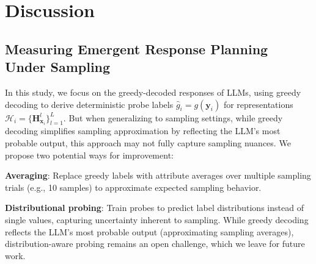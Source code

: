 \section{Discussion}
\subsection{Measuring Emergent Response Planning Under Sampling}
In this study, we focus on the greedy-decoded responses of LLMs, using greedy decoding to derive deterministic probe labels $\hat{g}_i = g(\mathbf{y}_i)$ for representations $\mathcal{H}_i = \{ \mathbf{H}^l_{\mathbf{x}_i}\}^L_{l=1}$.
But when generalizing to sampling settings, while greedy decoding simplifies sampling approximation by reflecting the LLM’s most probable output, this approach may not fully capture sampling nuances. We propose two potential ways for improvement:

\textbf{Averaging}: Replace greedy labels with attribute averages over multiple sampling trials (e.g., 10 samples) to approximate expected sampling behavior.

\textbf{Distributional probing}: Train probes to predict label distributions instead of single values, capturing uncertainty inherent to sampling. While greedy decoding reflects the LLM’s most probable output (approximating sampling averages), distribution-aware probing remains an open challenge, which we leave for future work.

